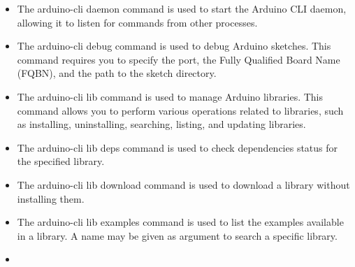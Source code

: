 \begin{itemize}
    
    
    \item {}
    
    The arduino-cli daemon command is used to start the Arduino CLI daemon, allowing it to listen for commands from other processes.
    
    
    \item {}
    
    The arduino-cli debug command is used to debug Arduino sketches. This command requires you to specify the port, the Fully Qualified Board Name (FQBN), and the path to the sketch directory.
    
    
    \item {}
    
    The arduino-cli lib command is used to manage Arduino libraries. This command allows you to perform various operations related to libraries, such as installing, uninstalling, searching, listing, and updating libraries.
    
    
    \item {}
    
    The arduino-cli lib deps command is used to check dependencies status for the specified library.
    
    
    \item {}
    
    The arduino-cli lib download command is used to download a library without installing them.
    
    
    \item {}
    
    The arduino-cli lib examples command is used to list the examples available in a library. A name may be given as argument to search a specific library.
    
    
    \item {}
    

\end{itemize}
